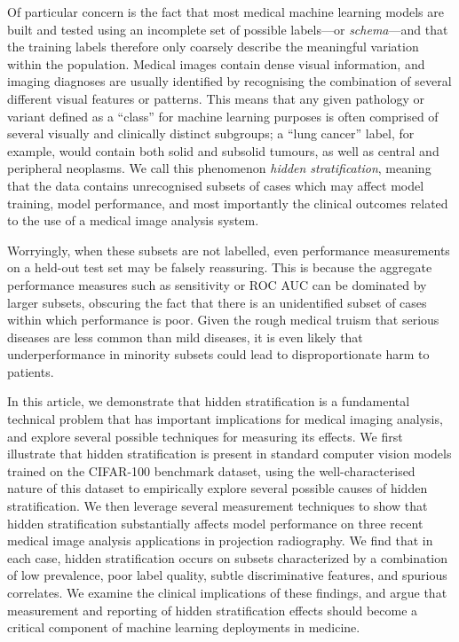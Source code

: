 \documentclass{article}
\begin{document}
Of particular concern is the fact that most medical machine learning models are built and tested using an incomplete set of possible labels---or \textit{schema}---and that the training labels therefore only coarsely describe the meaningful variation within the population. 
Medical images contain dense visual information, and imaging diagnoses are usually identified by recognising the combination of several different visual features or patterns. 
This means that any given pathology or variant defined as a ``class'' for machine learning purposes is often comprised of several visually and clinically distinct subgroups; a ``lung cancer'' label, for example, would contain both solid and subsolid tumours, as well as central and peripheral neoplasms. 
We call this phenomenon \textit{hidden stratification}, meaning that the data contains unrecognised subsets of cases which may affect model training, model performance, and most importantly the clinical outcomes related to the use of a medical image analysis system.  

Worryingly, when these subsets are not labelled, even performance measurements on a held-out test set may be falsely reassuring. 
This is because the aggregate performance measures such as sensitivity or ROC AUC can be dominated by larger subsets, obscuring the fact that there is an unidentified subset of cases within which performance is poor. 
Given the rough medical truism that serious diseases are less common than mild diseases, it is even likely that underperformance in minority subsets could lead to disproportionate harm to patients.

In this article, we demonstrate that hidden stratification is a fundamental technical problem that has important implications for medical imaging analysis, and explore several possible techniques for measuring its effects. 
We first illustrate that hidden stratification is present in standard computer vision models trained on the CIFAR-100 benchmark dataset, using the well-characterised nature of this dataset to empirically explore several possible causes of hidden stratification.
We then leverage several measurement techniques to show that hidden stratification substantially affects model performance on three recent medical image analysis applications in projection radiography.
We find that in each case, hidden stratification occurs on subsets characterized by a combination of low prevalence, poor label quality, subtle discriminative features, and spurious correlates. 
We examine the clinical implications of these findings, and argue that measurement and reporting of hidden stratification effects should become a critical component of machine learning deployments in medicine.
\end{document}
